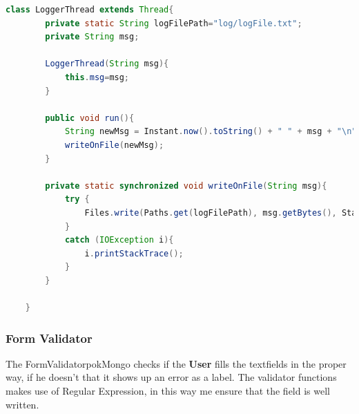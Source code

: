 \begin{lstlisting}[language=Java]
	class LoggerThread extends Thread{
		private static String logFilePath="log/logFile.txt";
		private String msg;
		
		LoggerThread(String msg){
			this.msg=msg;
		}
		
		public void run(){
			String newMsg = Instant.now().toString() + " " + msg + "\n";
			writeOnFile(newMsg);
		}
		
		private static synchronized void writeOnFile(String msg){
			try {
				Files.write(Paths.get(logFilePath), msg.getBytes(), StandardOpenOption.APPEND);
			}
			catch (IOException i){
				i.printStackTrace();
			}
		}
		
	}
\end{lstlisting}

\subsubsection{Form Validator}
The FormValidatorpokMongo checks if the \textbf{User} fills the textfields in the proper way, if he doesn’t that it shows up an error as a label. The validator functions makes use of Regular Expression, in this way me ensure that the field is well written.

